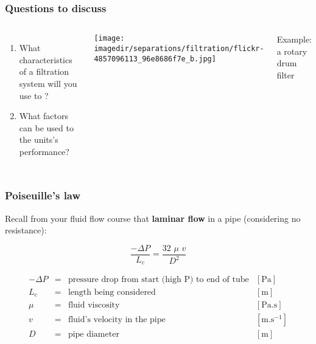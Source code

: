 \begin{frame}\frametitle{Questions to discuss}
	\begin{columns}[t]
			\begin{enumerate}
				\item	What characteristics of a filtration system will you use to {}?

				\vspace{36pt}
				\item	What factors can be used to {} the units's performance?
			\end{enumerate}
			\begin{center}
				\texttt{[image: \\imagedir/separations/filtration/flickr-4857096113\_96e8686f7e\_b.jpg]}
			\end{center}
			Example: a rotary drum filter
	\end{columns}
\end{frame}

\begin{frame}\frametitle{Poiseuille's law}
	Recall from your fluid flow course that \textbf{laminar flow} in a pipe (considering no resistance):
	\begin{exampleblock}{}
		\[\dfrac{-\Delta P}{L_c} = \dfrac{32\,\, \mu\,\, v}{D^2} \label{P}
		\]
	\end{exampleblock}
	\[
		\begin{array}{rcll}
			-\Delta P&=& \text{pressure drop from start (high P) to end of tube}&[\text{Pa}]\\
			L_c	    &=& \text{length being considered}                     	&[\text{m}]\\
			\mu 	&=& \text{fluid viscosity}  							&[\text{Pa.s}]\\
			v   	&=& \text{fluid's velocity in the pipe}					&[\text{m.s}^{-1}]\\
			D 		&=& \text{pipe diameter} 								&[\text{m}]
		\end{array}
	\]	
\end{frame}

